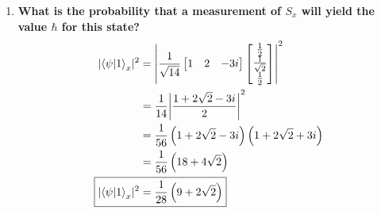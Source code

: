 \documentclass[11pt]{article}
\DeclarePairedDelimiter\abs{\lvert}{\rvert}
\begin{document}
\begin{enumerate}[label=\textbf{\arabic*.}]
{\begin{enumerate}[label=\textbf{(\alph*)}]
{\begin{align*}
                        \Aboxed{\langle S_z\rangle&=\frac{5}{7}\hbar}
                    \end{align*}
                }
                \item{
                    \textbf{\boldmath What is the probability that a measurement of \(S_x\) will yield the value \(\hbar\) for this state?}
                    \begin{align*}
                        \abs{\braket{\psi|1}_x}^2&=\abs*{\frac{1}{\sqrt{14}}\begin{bmatrix}1 & 2 & -3i\end{bmatrix}\begin{bmatrix}\frac 1 2 \\ \frac{1}{\sqrt 2} \\ \frac 1 2\end{bmatrix}}^2 \\
                        &=\frac{1}{14}\abs*{\frac{1+2\sqrt2-3i}{2}}^2 \\
                        &=\frac{1}{56}\left(1+2\sqrt2-3i\right)\left(1+2\sqrt2+3i\right) \\
                        &=\frac{1}{56}\left(18+4\sqrt2\right) \\
                        \Aboxed{\abs{\braket{\psi|1}_x}^2&=\frac{1}{28}\left(9+2\sqrt2\right)}
                    \end{align*}
                }
            \end{enumerate}
        }
    \end{enumerate}
\end{document}
